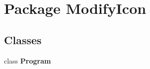 \hypertarget{namespace_modify_icon}{\section{Package Modify\-Icon}
\label{namespace_modify_icon}
}
\subsection*{Classes}
\begin{DoxyCompactItemize}
\item 
class {\bfseries Program}
\end{DoxyCompactItemize}
